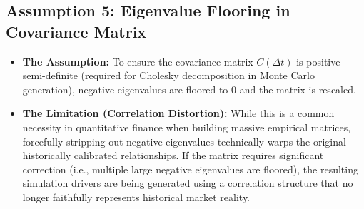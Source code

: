 \subsection*{Assumption 5: Eigenvalue Flooring in Covariance Matrix}
\begin{itemize}
	\item \textbf{The Assumption:} To ensure the covariance matrix $C(\Delta t)$ is positive semi-definite (required for Cholesky decomposition in Monte Carlo generation), negative eigenvalues are floored to $0$ and the matrix is rescaled.
	\item \textbf{The Limitation (Correlation Distortion):} While this is a common necessity in quantitative finance when building massive empirical matrices, forcefully stripping out negative eigenvalues technically warps the original historically calibrated relationships. If the matrix requires significant correction (i.e., multiple large negative eigenvalues are floored), the resulting simulation drivers are being generated using a correlation structure that no longer faithfully represents historical market reality.
\end{itemize}




\newpage



